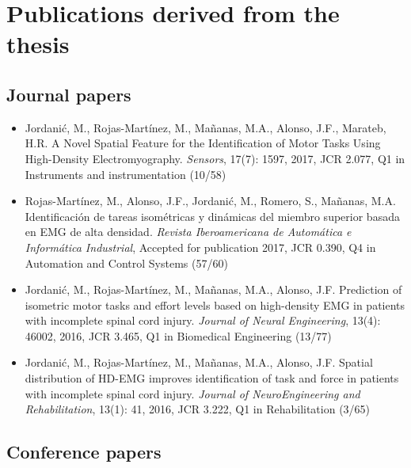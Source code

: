 \section {Publications derived from the thesis}
\subsection{Journal papers}

\begin{itemize}
\item Jordanić, M., Rojas-Martínez, M., Mañanas, M.A., Alonso, J.F., Marateb, H.R. A Novel Spatial Feature for the Identification of Motor Tasks Using High-Density Electromyography. \textit{Sensors}, 17(7): 1597, 2017, JCR 2.077, Q1 in Instruments and instrumentation (10/58)

\item Rojas-Martínez, M., Alonso, J.F., Jordanić, M., Romero, S., Mañanas, M.A. Identificación de tareas isométricas y dinámicas del miembro superior basada en EMG de alta densidad. \textit{Revista Iberoamericana de Automática e Informática Industrial}, Accepted for publication 2017, JCR 0.390, Q4 in Automation and Control Systems (57/60)

\item Jordanić, M., Rojas-Martínez, M., Mañanas, M.A., Alonso, J.F. Prediction of isometric motor tasks and effort levels based on high-density EMG in patients with incomplete spinal cord injury. \textit{Journal of Neural Engineering}, 13(4): 46002, 2016, JCR 3.465, Q1 in Biomedical Engineering (13/77)

\item Jordanić, M., Rojas-Martínez, M., Mañanas, M.A., Alonso, J.F. Spatial distribution of HD-EMG improves identification of task and force in patients with incomplete spinal cord injury. \textit{Journal of NeuroEngineering and Rehabilitation}, 13(1): 41, 2016, JCR 3.222, Q1 in Rehabilitation (3/65)
\end{itemize}


\subsection{Conference papers}

